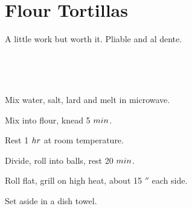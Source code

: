 \section[Tortillas]{Flour Tortillas}


\begin{recipestats}[
	servings=16,
	preptime=30~\minute,
	bakingtime=15~\minute,
	inactivetime=90~\minute,
	original=\citeauthor{essentialMexicoKennedy}~\cite{essentialMexicoKennedy},
]
\end{recipestats}

\begin{recipeabstract}
	A little work but worth it.
	Pliable and al dente.
\end{recipeabstract}


\begin{ingredientcolumns}
	\begin{ingredientblock}
		\\
	\end{ingredientblock}
	\begin{ingredientblock}
		\ingredient[5][g]{salt}\\
		\ingredient[250][ml]{water, warm}
	\end{ingredientblock}
\end{ingredientcolumns}


\begin{preparation}
\item Mix water, salt, lard and melt in microwave.
\item Mix into flour, knead 5 $\minute$.
\item Rest 1 $\hour$ at room temperature.
\item Divide, roll into balls, rest 20 $\minute$.
\item Roll flat, grill on high heat, about 15 $\second$ each side.
\item Set aside in a dish towel.
\end{preparation}


\recipeend%
